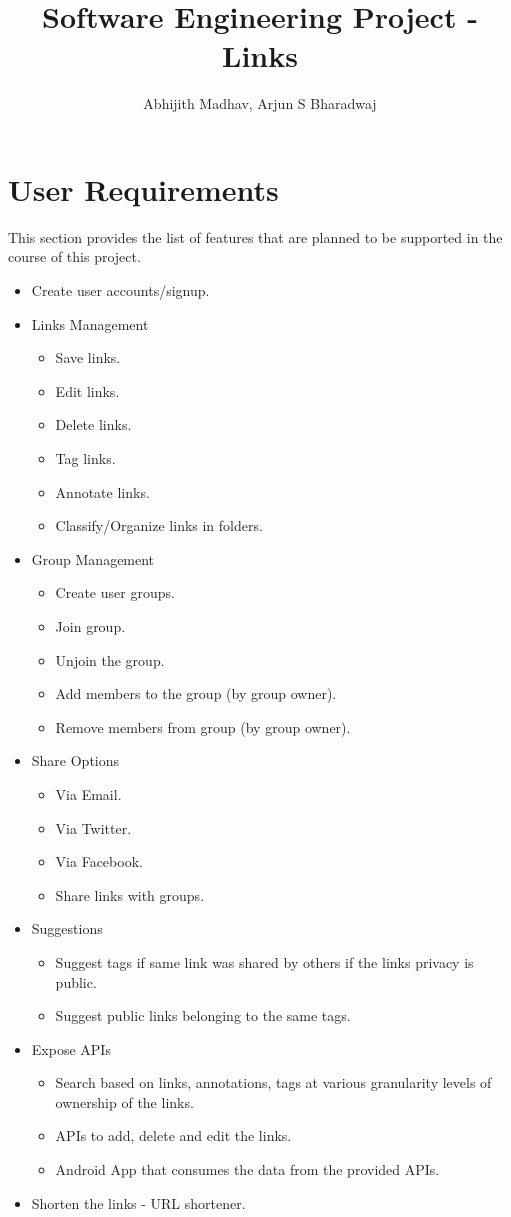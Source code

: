 \documentclass[11pt]{report} %
\title{Software Engineering Project - Links}
\author{Abhijith Madhav, Arjun S Bharadwaj}
\begin{document}
\maketitle
\section*{User Requirements}
This section provides the list of features that are planned to be supported in the course of this project.
\begin{itemize}
\item
	Create user accounts/signup.
\item
Links Management
\begin{itemize}
	\item
		Save links.
	\item
		Edit links.
	\item
		Delete links.
	\item
		Tag links.
	\item
		Annotate links.
	\item
		Classify/Organize links in folders.
\end{itemize}
\item
Group Management
\begin{itemize}
	\item
		Create user groups.
	\item
		Join group.
	\item
		Unjoin the group.
	\item
		Add members to the group (by group owner).
	\item
		Remove members from group (by group owner).
\end{itemize}
\item
Share Options
\begin{itemize}
	\item
		Via Email.
	\item
		Via Twitter.
	\item
		Via Facebook.
	\item
		Share links with groups.
\end{itemize}
\item
Suggestions
\begin{itemize}
	\item
		Suggest tags if same link was shared by others if the links privacy is public.
	\item
		Suggest public links belonging to the same tags.
\end{itemize}
\item
Expose APIs
\begin{itemize}
	\item
	Search based on links, annotations, tags at various granularity levels of ownership of the links.
	\item
	APIs to add, delete and edit the links.
	\item
	Android App that consumes the data from the provided APIs.
\end{itemize}
\item
Shorten the links - URL shortener.
\end{itemize}
\end{document}
